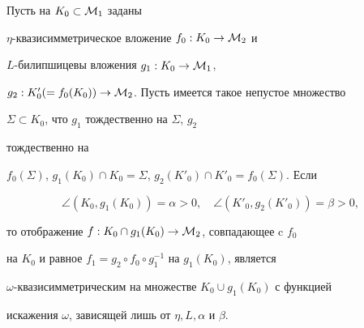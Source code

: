 \begin{cors}


Пусть на $K_0 \subset {\cal M}_1$ заданы 


$\eta$-{}квазисимметрическое вложение $f_0: K_0 \to {\cal M}_2$ и 


$L$-билипшицевы вложения $g_1: K_0 \to {\cal M}_1$, 


$g_2: K'_0(=f_0(K_0)) \to {\cal M}_2$. Пусть имеется такое непустое множество 


$\Sigma {\subset} K_0$, что $g_1$ тождественно на $\Sigma$, $g_2$ 


тождественно на 


$f_0(\Sigma)$, $g_1(K_0)\cap K_0=\Sigma$, $g_2(K'_0)\cap K'_0=


f_0(\Sigma)$. Если 


\begin{equation}


\angle(K_0, g_1(K_0))=\alpha >0, \quad \angle(K'_0, g_2(K'_0))=\beta > 0,


\end{equation} 


то отображение $f: K_0\cap g_1(K_0) \to {\cal M}_2$, совпадающее c $f_0$ 


на $K_0$ и равное $f_1=g_2\circ f_0 \circ g_1^{-1}$ на $g_1(K_0)$, является 


$\omega$-{}квазисимметрическим на множестве $K_0\cup g_1(K_0)$ с функцией 


искажения $\omega$, зависящей лишь от $\eta, L, \alpha$ и $\beta$.


\end{cors}









